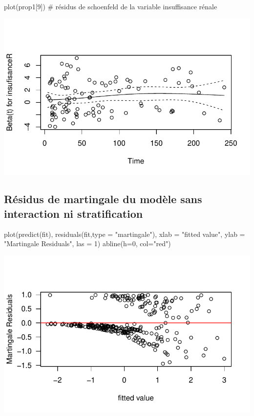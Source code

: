 \documentclass[
  letterpaper,
  DIV=11,
  numbers=noendperiod]{scrartcl}
\newenvironment{Shaded}{\begin{snugshade}}{\end{snugshade}}
\newcommand{\AttributeTok}[1]{\textcolor[rgb]{0.40,0.45,0.13}{#1}}
\newcommand{\CommentTok}[1]{\textcolor[rgb]{0.37,0.37,0.37}{#1}}
\newcommand{\DecValTok}[1]{\textcolor[rgb]{0.68,0.00,0.00}{#1}}
\newcommand{\FunctionTok}[1]{\textcolor[rgb]{0.28,0.35,0.67}{#1}}
\newcommand{\NormalTok}[1]{\textcolor[rgb]{0.00,0.23,0.31}{#1}}
\newcommand{\StringTok}[1]{\textcolor[rgb]{0.13,0.47,0.30}{#1}}
\begin{document}
\begin{Shaded}
\begin{Highlighting}[]
\FunctionTok{plot}\NormalTok{(prop1[}\DecValTok{9}\NormalTok{]) }\CommentTok{\# résidus de schoenfeld de la variable insuffisance rénale}
\end{Highlighting}
\end{Shaded}

\includegraphics{Rapport-technique_files/figure-pdf/unnamed-chunk-5-2.pdf}

\subsection{Résidus de martingale du modèle sans interaction ni
stratification}\label{ruxe9sidus-de-martingale-du-moduxe8le-sans-interaction-ni-stratification}

\begin{Shaded}
\begin{Highlighting}[]
\FunctionTok{plot}\NormalTok{(}\FunctionTok{predict}\NormalTok{(fit), }\FunctionTok{residuals}\NormalTok{(fit,}\AttributeTok{type =} \StringTok{"martingale"}\NormalTok{),}
     \AttributeTok{xlab =} \StringTok{"fitted value"}\NormalTok{, }\AttributeTok{ylab =} \StringTok{"Martingale Residuals"}\NormalTok{, }\AttributeTok{las =} \DecValTok{1}\NormalTok{)}
\FunctionTok{abline}\NormalTok{(}\AttributeTok{h=}\DecValTok{0}\NormalTok{, }\AttributeTok{col=}\StringTok{"red"}\NormalTok{)}
\end{Highlighting}
\end{Shaded}

\includegraphics{Rapport-technique_files/figure-pdf/unnamed-chunk-6-1.pdf}
\end{document}

